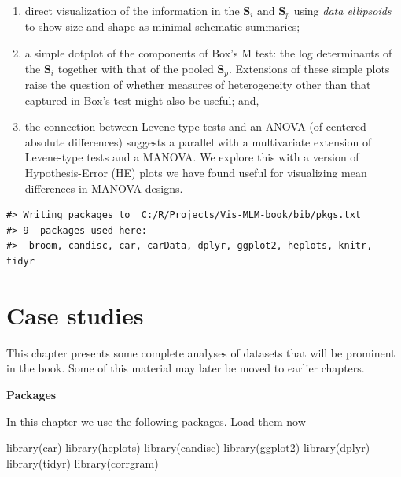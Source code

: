 \documentclass[
  letterpaper,
  10pt,
  krantz2]{krantz}
\makeatletter
\newenvironment{Shaded}{\begin{snugshade}}{\end{snugshade}}
\newcommand{\FunctionTok}[1]{\textcolor[rgb]{0.28,0.35,0.67}{#1}}
\newcommand{\NormalTok}[1]{\textcolor[rgb]{0.00,0.23,0.31}{#1}}
\newenvironment{kframe}{%
  \medskip{}
  \setlength{\fboxsep}{.8em}
  \def\at@end@of@kframe{}%
  \ifinner\ifhmode%
  \def\at@end@of@kframe{\end{minipage}}%
  \begin{minipage}{\columnwidth}%
  \fi\fi%
  \def\FrameCommand##1{\hskip\@totalleftmargin \hskip-\fboxsep
  \colorbox{shadecolor}{##1}\hskip-\fboxsep
      \hskip-\linewidth \hskip-\@totalleftmargin \hskip\columnwidth}%
  \MakeFramed {\advance\hsize-\width
    \@totalleftmargin\z@ \linewidth\hsize
    \@setminipage}}%
{\par\unskip\endMakeFramed%
  \at@end@of@kframe}
\renewenvironment{Shaded}{\begin{kframe}}{\end{kframe}}
\makeatother
\begin{document}
\begin{enumerate}
\def\labelenumi{(\alph{enumi})}
\item
  direct visualization of the information in the \(\mathbf{S}_i\) and
  \(\mathbf{S}_p\) using \emph{data ellipsoids} to show size and shape
  as minimal schematic summaries;
\item
  a simple dotplot of the components of Box's M test: the log
  determinants of the \(\mathbf{S}_i\) together with that of the pooled
  \(\mathbf{S}_p\). Extensions of these simple plots raise the question
  of whether measures of heterogeneity other than that captured in Box's
  test might also be useful; and,
\item
  the connection between Levene-type tests and an ANOVA (of centered
  absolute differences) suggests a parallel with a multivariate
  extension of Levene-type tests and a MANOVA. We explore this with a
  version of Hypothesis-Error (HE) plots we have found useful for
  visualizing mean differences in MANOVA designs.
\end{enumerate}

\begin{verbatim}
#> Writing packages to  C:/R/Projects/Vis-MLM-book/bib/pkgs.txt
#> 9  packages used here:
#>  broom, candisc, car, carData, dplyr, ggplot2, heplots, knitr, tidyr
\end{verbatim}


\chapter{Case studies}\label{case-studies}

This chapter presents some complete analyses of datasets that will be
prominent in the book. Some of this material may later be moved to
earlier chapters.

\textbf{Packages}

In this chapter we use the following packages. Load them now

\begin{Shaded}
\begin{Highlighting}[]
\FunctionTok{library}\NormalTok{(car)}
\FunctionTok{library}\NormalTok{(heplots)}
\FunctionTok{library}\NormalTok{(candisc)}
\FunctionTok{library}\NormalTok{(ggplot2)}
\FunctionTok{library}\NormalTok{(dplyr)}
\FunctionTok{library}\NormalTok{(tidyr)}
\FunctionTok{library}\NormalTok{(corrgram)}
\end{Highlighting}
\end{Shaded}
\end{document}
